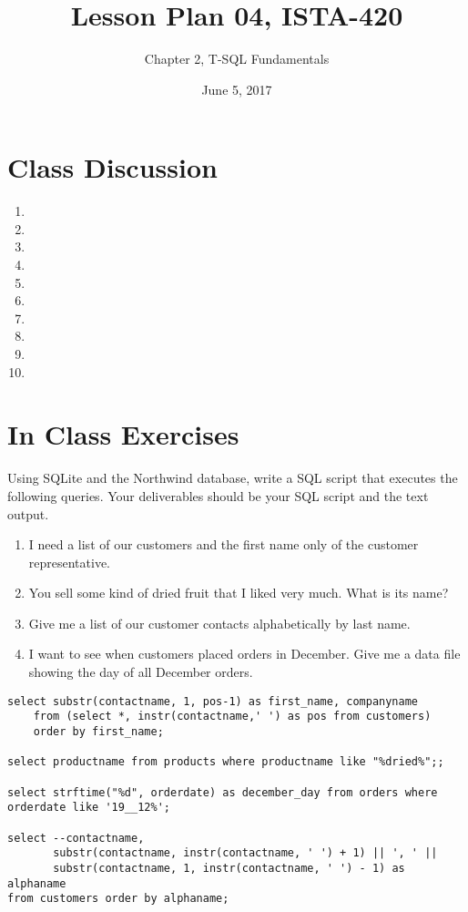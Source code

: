 \documentclass{article}
\title{Lesson Plan 04, ISTA-420}
\author{Chapter 2, T-SQL Fundamentals}
\date{June 5, 2017}
\begin{document}
    

    \maketitle{}

    \section{Class Discussion}

    \begin{enumerate}

        \item 
        \item 
        \item 
        \item 
        \item 
        \item 
        \item 
        \item 
        \item 
        \item 



    \end{enumerate}


    \section{In Class Exercises}

Using SQLite and the Northwind database, write a SQL script that executes the following queries. Your deliverables should be your SQL script and the text output.

    \begin{enumerate}
\item I need a list of our customers and the first name only of the customer representative.
\item You sell some kind of dried fruit that I liked very much. What is its name?
\item Give me a list of our customer contacts alphabetically by last name. 
\item I want to see when customers placed orders in December. Give me a data file showing the day of all December orders.
    \end{enumerate}

    \begin{lstlisting}
select substr(contactname, 1, pos-1) as first_name, companyname
    from (select *, instr(contactname,' ') as pos from customers)
    order by first_name;

select productname from products where productname like "%dried%";;

select strftime("%d", orderdate) as december_day from orders where orderdate like '19__12%';

select --contactname, 
       substr(contactname, instr(contactname, ' ') + 1) || ', ' ||
       substr(contactname, 1, instr(contactname, ' ') - 1) as alphaname
from customers order by alphaname;
    \end{lstlisting}
\end{document}
